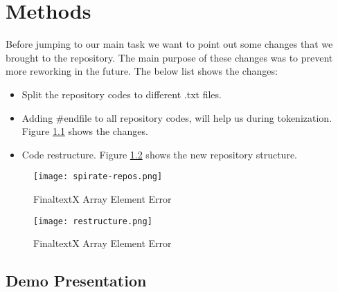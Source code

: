 \chapter{Methods}\label{chap:methods}
Before jumping to our main task we want to point out some changes that we brought to the repository. The main purpose of these changes was to prevent more reworking in the future.
The below list shows the changes:
\begin{itemize}
    \item Split the repository codes to different .txt files.
    \item Adding \#endfile to all repository codes, will help us during tokenization. 
 Figure \ref{fig:sepRepo} shows the changes.
    \item Code restructure. Figure \ref{fig:restructure} shows the new repository structure.
\end{itemize}

\begin{figure}[H]
    \centering
    \texttt{[image: spirate-repos.png]}
    \caption{FinaltextX Array Element Error}
    \label{fig:sepRepo}
\end{figure}

\begin{figure}[H]
    \centering
    \texttt{[image: restructure.png]}
    \caption{FinaltextX Array Element Error}
    \label{fig:restructure}
\end{figure}

\section{Demo Presentation}
